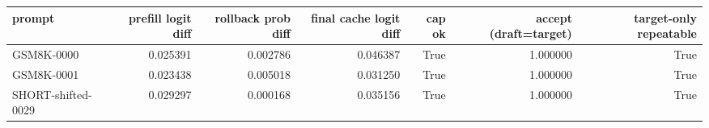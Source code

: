 \begin{tabular}{lrrrrrr}
\toprule
prompt & prefill logit diff & rollback prob diff & final cache logit diff & cap ok & accept (draft=target) & target-only repeatable \\
\midrule
GSM8K-0000 & 0.025391 & 0.002786 & 0.046387 & True & 1.000000 & True \\
GSM8K-0001 & 0.023438 & 0.005018 & 0.031250 & True & 1.000000 & True \\
SHORT-shifted-0029 & 0.029297 & 0.000168 & 0.035156 & True & 1.000000 & True \\
\bottomrule
\end{tabular}

